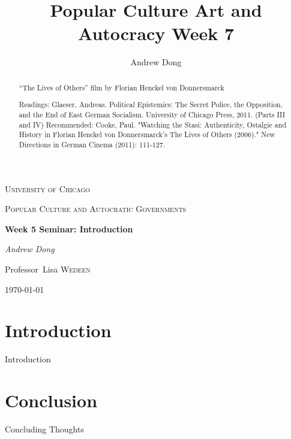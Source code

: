 \documentclass{article}
\begin{document}
\begin{titlepage}
	\centering
	{\scshape\LARGE University of Chicago \par}
	\vspace{1cm}
	{\scshape\Large Popular Culture and Autocratic Governments\par}
	\vspace{1.5cm}
	{\huge\bfseries Week 5 Seminar: Introduction \par}
	\vspace{1cm}
	{\Large\itshape Andrew Dong\par}
	\vspace{2cm}
	
	\vfill


\begin{abstract}
“The Lives of Others” film by Florian Henckel von Donnersmarck 

Readings: 
Glaeser, Andreas. Political Epistemics: The Secret Police, the Opposition, and the End of East German Socialism. University of Chicago Press, 2011. (Parts III and IV) 
Recommended: Cooke, Paul. "Watching the Stasi: Authenticity, Ostalgie and History in Florian Henckel von Donnersmarck’s The Lives of Others (2006)." New Directions in German Cinema (2011): 111-127. 

\end{abstract}

\vfill

	Professor~Lisa \textsc{Wedeen}
	\vspace{5 mm}
	\\{\large \today\par}
\end{titlepage}

\title{Popular Culture Art and Autocracy Week 7}
\author{Andrew Dong}

\maketitle


\section{Introduction}

Introduction




\section{Conclusion}

Concluding Thoughts
\end{document}
